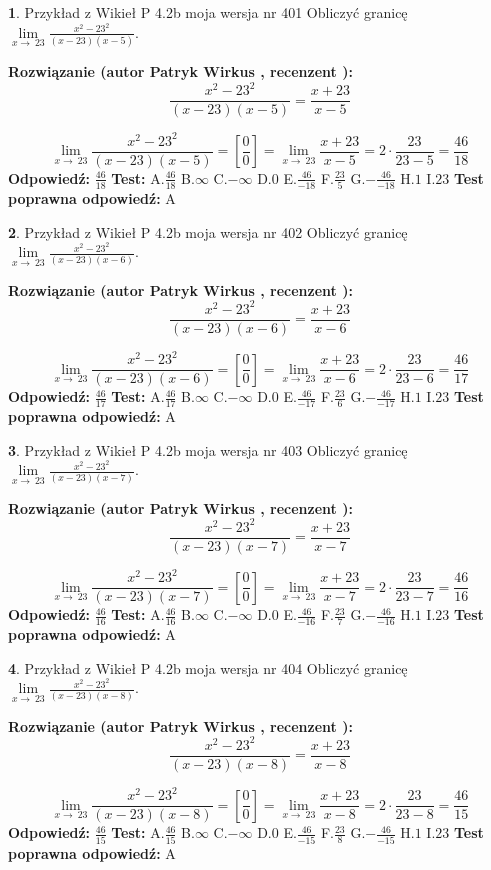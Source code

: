 \documentclass[12pt, a4paper]{article}
\theoremstyle{definition} %
\newtheorem{zad}{}
\newcommand{\zadStart}[1]{\begin{zad}#1\newline}
\newcommand{\zadStop}{\end{zad}}
\newcommand{\rozwStart}[2]{\noindent \textbf{Rozwiązanie (autor #1 , recenzent #2): }\newline}
\newcommand{\rozwStop}{\newline}
\newcommand{\odpStart}{\noindent \textbf{Odpowiedź:}\newline}
\newcommand{\odpStop}{\newline}
\newcommand{\testStart}{\noindent \textbf{Test:}\newline}
\newcommand{\testStop}{\newline}
\newcommand{\kluczStart}{\noindent \textbf{Test poprawna odpowiedź:}\newline}
\newcommand{\kluczStop}{\newline}
\begin{document}
\zadStart{Przykład z Wikieł P 4.2b moja wersja nr 401}
Obliczyć granicę $\lim\limits_{x\to\ 23}\frac{x^{2}-23^{2}}{(x-23)(x-5)}$.
\zadStop
\rozwStart{Patryk Wirkus}{}
$$\frac{x^{2}-23^{2}}{(x-23)(x-5)}=\frac{x+23}{x-5}$$

$$\lim\limits_{x\to\ 23}\frac{x^{2}-23^{2}}{(x-23)(x-5)}=[\frac{0}{0}]=\lim\limits_{x\to\ 23}\frac{x+23}{x-5}=2 \cdot \frac{23}{23-5} = \frac{46}{18}$$
\rozwStop
\odpStart
$\frac{46}{18}$
\odpStop
\testStart
A.$\frac{46}{18}$
B.$\infty$
C.$-\infty$
D.$0$
E.$\frac{46}{-18}$
F.$\frac{23}{5}$
G.$-\frac{46}{-18}$
H.$1$
I.$23$
\testStop
\kluczStart
A
\kluczStop



\zadStart{Przykład z Wikieł P 4.2b moja wersja nr 402}
Obliczyć granicę $\lim\limits_{x\to\ 23}\frac{x^{2}-23^{2}}{(x-23)(x-6)}$.
\zadStop
\rozwStart{Patryk Wirkus}{}
$$\frac{x^{2}-23^{2}}{(x-23)(x-6)}=\frac{x+23}{x-6}$$

$$\lim\limits_{x\to\ 23}\frac{x^{2}-23^{2}}{(x-23)(x-6)}=[\frac{0}{0}]=\lim\limits_{x\to\ 23}\frac{x+23}{x-6}=2 \cdot \frac{23}{23-6} = \frac{46}{17}$$
\rozwStop
\odpStart
$\frac{46}{17}$
\odpStop
\testStart
A.$\frac{46}{17}$
B.$\infty$
C.$-\infty$
D.$0$
E.$\frac{46}{-17}$
F.$\frac{23}{6}$
G.$-\frac{46}{-17}$
H.$1$
I.$23$
\testStop
\kluczStart
A
\kluczStop



\zadStart{Przykład z Wikieł P 4.2b moja wersja nr 403}
Obliczyć granicę $\lim\limits_{x\to\ 23}\frac{x^{2}-23^{2}}{(x-23)(x-7)}$.
\zadStop
\rozwStart{Patryk Wirkus}{}
$$\frac{x^{2}-23^{2}}{(x-23)(x-7)}=\frac{x+23}{x-7}$$

$$\lim\limits_{x\to\ 23}\frac{x^{2}-23^{2}}{(x-23)(x-7)}=[\frac{0}{0}]=\lim\limits_{x\to\ 23}\frac{x+23}{x-7}=2 \cdot \frac{23}{23-7} = \frac{46}{16}$$
\rozwStop
\odpStart
$\frac{46}{16}$
\odpStop
\testStart
A.$\frac{46}{16}$
B.$\infty$
C.$-\infty$
D.$0$
E.$\frac{46}{-16}$
F.$\frac{23}{7}$
G.$-\frac{46}{-16}$
H.$1$
I.$23$
\testStop
\kluczStart
A
\kluczStop



\zadStart{Przykład z Wikieł P 4.2b moja wersja nr 404}
Obliczyć granicę $\lim\limits_{x\to\ 23}\frac{x^{2}-23^{2}}{(x-23)(x-8)}$.
\zadStop
\rozwStart{Patryk Wirkus}{}
$$\frac{x^{2}-23^{2}}{(x-23)(x-8)}=\frac{x+23}{x-8}$$

$$\lim\limits_{x\to\ 23}\frac{x^{2}-23^{2}}{(x-23)(x-8)}=[\frac{0}{0}]=\lim\limits_{x\to\ 23}\frac{x+23}{x-8}=2 \cdot \frac{23}{23-8} = \frac{46}{15}$$
\rozwStop
\odpStart
$\frac{46}{15}$
\odpStop
\testStart
A.$\frac{46}{15}$
B.$\infty$
C.$-\infty$
D.$0$
E.$\frac{46}{-15}$
F.$\frac{23}{8}$
G.$-\frac{46}{-15}$
H.$1$
I.$23$
\testStop
\kluczStart
A
\kluczStop
\end{document}
